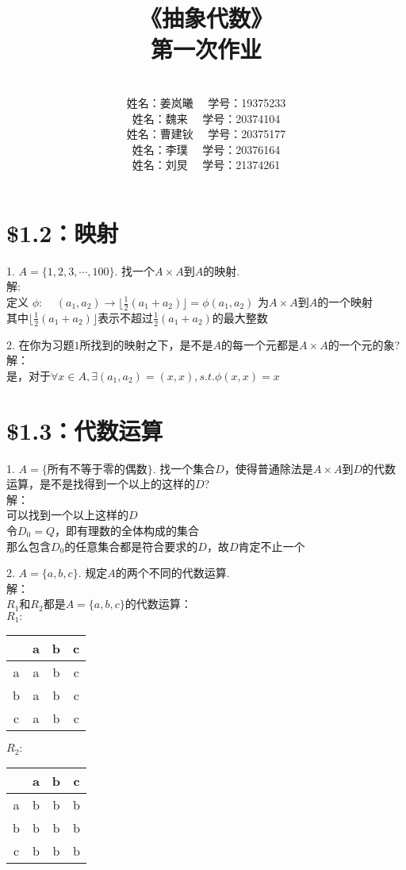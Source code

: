 \documentclass{ctexart}
\title{《抽象代数》\\ 第一次作业}
\author{\\姓名：姜岚曦 \ \ 学号：19375233
		\\姓名：魏来   \ \ 学号：20374104         
	    \\姓名：曹建钬 \ \ 学号：20375177
        \\姓名：李璞   \ \ 学号：20376164
        \\姓名：刘炅   \ \ 学号：21374261}
\date{}
\begin{document}
\pagestyle{empty}
\thispagestyle{empty}
\maketitle
\clearpage	
	
\section*{\$1.2：映射}
1. $A = \{1,2,3, \cdots, 100\}$. 找一个$A × A$到$A$的映射. \\
解: \\
定义 $\phi: \ \ \ \ \ (a_1,a_2) \longrightarrow \lfloor\frac{1}{2}(a_1+a_2)\rfloor=\phi(a_1,a_2)$
为$A×A$到$A$的一个映射 \\
其中$\lfloor\frac{1}{2}(a_1+a_2)\rfloor$表示不超过$\frac{1}{2}(a_1+a_2)$的最大整数

2. 在你为习题$1$所找到的映射之下，是不是$A$的每一个元都是$A×A$的一个元的象? \\
解：\\
是，对于$\forall x \in A, \exists (a_1,a_2)=(x,x), s.t. \phi(x,x)=x$
\section*{\$1.3：代数运算}
1. $A=\{ $所有不等于零的偶数$\}$. 找一个集合$D$，使得普通除法是$A×A$到$D$的代数运算，是不是找得到一个以上的这样的$D$? \\
解：\\ 可以找到一个以上这样的$D$ \\
令$D_0=Q$，即有理数的全体构成的集合 \\
那么包含$D_0$的任意集合都是符合要求的$D$，故$D$肯定不止一个

2. $A= \{a,b,c\}$. 规定$A$的两个不同的代数运算. \\
解：\\
$R_1$和$R_2$都是$A= \{a,b,c\}$的代数运算：\\
$R_1:$\begin{center}
	\begin{tabular}{c|ccc}
		& a & b & c \\
		\hline
		a & a & b & c \\
		b & a & b & c \\
		c & a & b & c \\
	\end{tabular} 
\end{center}
$R_2:$\begin{center}
	\begin{tabular}{c|ccc}
		& a & b & c \\
		\hline
		a & b & b & b \\
		b & b & b & b \\
		c & b & b & b \\
	\end{tabular} 
\end{center}
\end{document}

